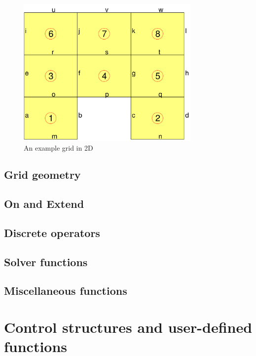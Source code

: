\documentclass[11pt]{article}
\begin{document}
\begin{figure}
\centering
\includegraphics[width=0.8\textwidth]{grid-enumeration}
\caption{An example grid in 2D}
\label{fig:2dgrid}
\end{figure}

\subsection{Grid geometry}

\subsection{On and Extend}
\label{subsec:on-extend}

\subsection{Discrete operators}

\subsection{Solver functions}

\subsection{Miscellaneous functions}

\section{Control structures and user-defined functions}
\end{document}
